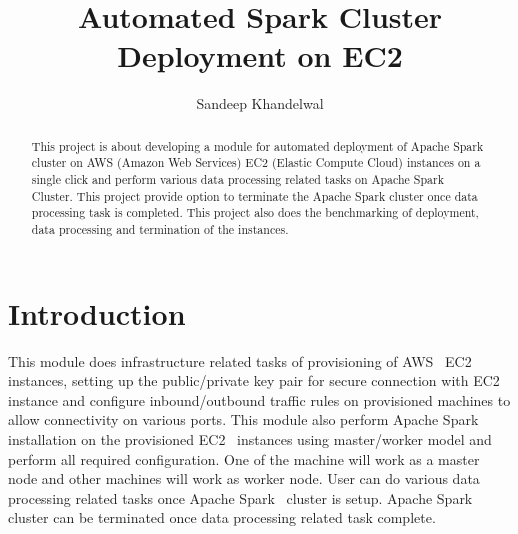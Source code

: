 
\title{Automated Spark Cluster Deployment on EC2}


\author{Sandeep Khandelwal}



\renewcommand{\shortauthors}{Sandeep}


\begin{abstract}

This project is about developing a module for automated deployment of
Apache Spark cluster on AWS (Amazon Web Services) EC2 (Elastic Compute
Cloud) instances on a single click and perform various data processing
related tasks on Apache Spark Cluster. This project provide option to terminate the Apache Spark 
cluster once data processing task is completed. This project also does the
benchmarking of deployment, data processing and termination of the
instances.

\end{abstract}



\maketitle

\section{Introduction}

This module does infrastructure related tasks of provisioning of
AWS~\cite{hid-sp18-511-www-aws} EC2~\cite{hid-sp18-511-www-ec2} instances, setting up the
public/private key pair for secure connection with EC2~\cite{hid-sp18-511-www-ec2} instance and configure
inbound/outbound traffic rules on provisioned machines to allow
connectivity on various ports. This module also perform Apache Spark~\cite{hid-sp18-511-www-spark}
installation on the provisioned EC2~\cite{hid-sp18-511-www-ec2}
instances using master/worker model and perform all required
configuration. One of the machine will work as a master node and other
machines will work as worker node. User can do various data processing related tasks once Apache Spark~\cite{hid-sp18-511-www-spark} cluster is setup. Apache Spark~\cite{hid-sp18-511-www-spark} cluster can be terminated once data processing related task complete.

